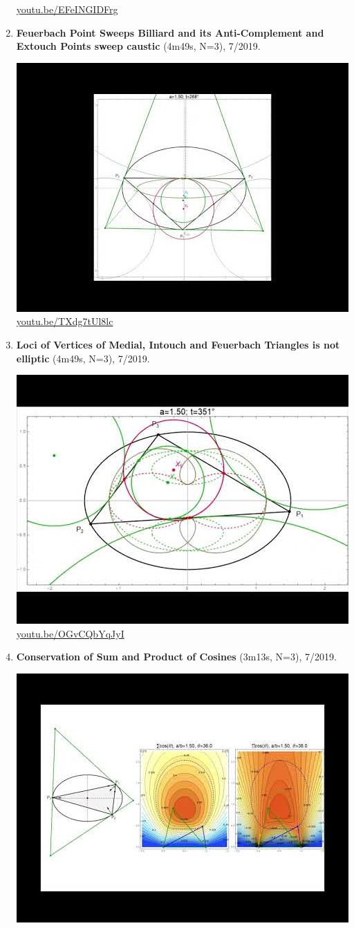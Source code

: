 \documentclass[12pt]{amsart}
\begin{document}
\begin{enumerate}[resume]
\begin{center}
\href{https://youtu.be/EFeINGIDFrg}{\url{youtu.be/EFeINGIDFrg}}\end{center}
% 
\item \textbf{Feuerbach Point Sweeps Billiard and its Anti-Complement and Extouch Points sweep caustic} (4m49s, N=3), 7/2019. 
\begin{center}\includegraphics[width=.5\textwidth]{pics/TXdg7tUl8lc.jpg} \\ 
\href{https://youtu.be/TXdg7tUl8lc}{\url{youtu.be/TXdg7tUl8lc}}\end{center}
% 
\item \textbf{Loci of Vertices of Medial, Intouch and Feuerbach Triangles is not elliptic} (4m49s, N=3), 7/2019. 
\begin{center}\includegraphics[width=.5\textwidth]{pics/OGvCQbYqJyI.jpg} \\ 
\href{https://youtu.be/OGvCQbYqJyI}{\url{youtu.be/OGvCQbYqJyI}}\end{center}
% 
\item \textbf{Conservation of Sum and Product of Cosines} (3m13s, N=3), 7/2019. 
\begin{center}\includegraphics[width=.5\textwidth]{pics/P8ykpE_ZbZ8.jpg} \\ 

\end{center}
\end{enumerate}
\end{document}

